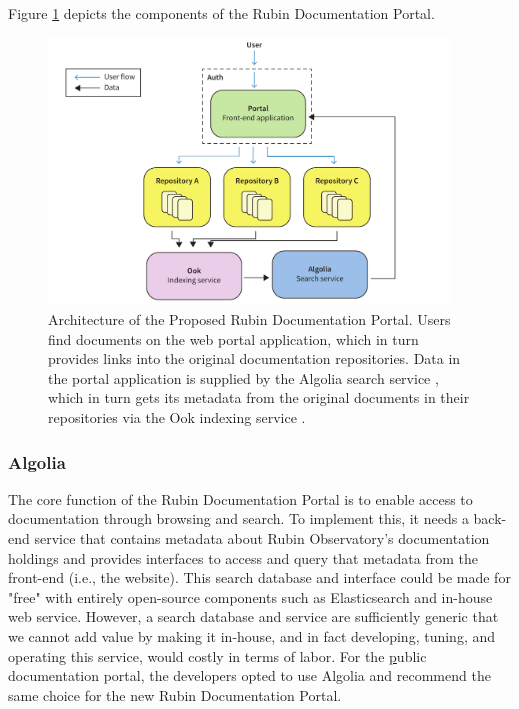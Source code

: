 Figure \ref{fig:portal-architecture} depicts the components of the Rubin Documentation Portal.

\begin{figure}[hp!]
\centering
\includegraphics[width=0.95\textwidth]{portal-architecture}
\caption{Architecture of the Proposed Rubin Documentation Portal.
Users find documents on the web portal application, which in turn provides links into the original documentation repositories.
Data in the portal application is supplied by the Algolia search service \citep{Algolia-cite}, which in turn gets its metadata from the original documents in their repositories via the Ook indexing service \citep{ook-cite}.}
\label{fig:portal-architecture}
\end{figure}

\subsubsection{Algolia}

The core function of the Rubin Documentation Portal is to enable access to documentation through browsing and search.
To implement this, it needs a back-end service that contains metadata about Rubin Observatory's documentation holdings and provides interfaces to access and query that metadata from the front-end (i.e., the website).
This search database and interface could be made for "free" with entirely open-source components such as Elasticsearch \citep{elastic-cite} and in-house web service.
However, a search database and service are sufficiently generic that we cannot add value by making it in-house, and in fact developing, tuning, and operating this service, would costly in terms of labor.
For the \href{www.lsst.io} public documentation portal, the developers opted to use Algolia and recommend the same choice for the new Rubin Documentation Portal.

